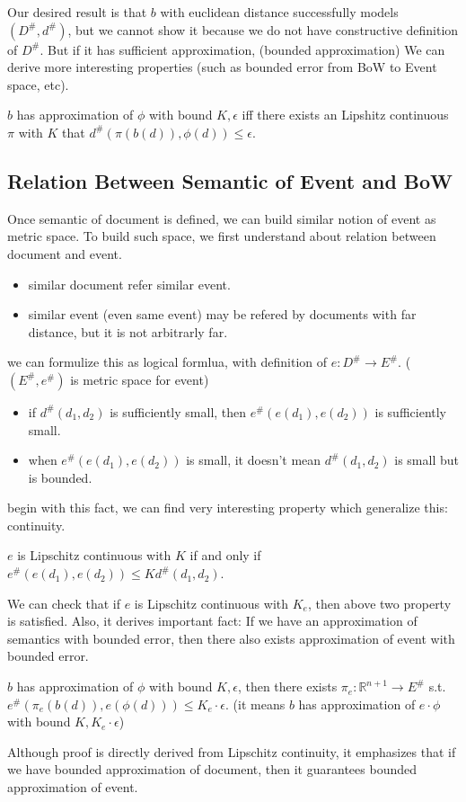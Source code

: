 Our desired result is that $b$ with euclidean distance successfully models $(D^{\#}, d^{\#})$, but we cannot show it because we do not have
constructive definition of $D^{\#}$. But if it has sufficient approximation, (bounded approximation)
We can derive more interesting properties (such as bounded error from BoW to Event space, etc).

\begin{definition}
    $b$ has approximation of $\phi$ with bound $K, \epsilon$ iff there exists an Lipshitz continuous $\pi$ with $K$ that $d^{\#}(\pi(b(d)), \phi(d)) \leq \epsilon$.
\end{definition}

\subsection{Relation Between Semantic of Event and BoW}
Once semantic of document is defined, we can build similar notion of event as metric space. To build such space, we first understand about
relation between document and event.
\begin{itemize}
    \item similar document refer similar event.
    \item similar event (even same event) may be refered by documents with far distance, but it is not arbitrarly far.
\end{itemize}
we can formulize this as logical formlua, with definition of $e: D^{\#} \rightarrow E^{\#}$. ($(E^{\#}, e^{\#})$ is metric space for event)
\begin{itemize}
    \item if $d^{\#}(d_{1}, d_{2})$ is sufficiently small, then $e^{\#}(e(d_{1}), e(d_{2}))$ is sufficiently small.
    \item when $e^{\#}(e(d_{1}), e(d_{2}))$ is small, it doesn't mean $d^{\#}(d_{1}, d_{2})$ is small but is bounded.
\end{itemize}
begin with this fact, we can find very interesting property which generalize this: continuity.
\begin{definition}
    $e$ is Lipschitz continuous with $K$ if and only if\\ $e^{\#}(e(d_{1}), e(d_{2})) \leq K d^{\#}(d_{1}, d_{2})$.
\end{definition}

We can check that if $e$ is Lipschitz continuous with $K_{e}$, then above two property is satisfied. Also, it derives important fact:
If we have an approximation of semantics with bounded error, then there also exists approximation of event with bounded error.
\begin{theorem}
    $b$ has approximation of $\phi$ with bound $K, \epsilon$, then there exists $\pi_{e}: \mathbb{R}^{n+1} \rightarrow E^{\#}$ s.t.
    $e^{\#}(\pi_{e}(b(d)), e(\phi(d))) \leq K_{e} \cdot \epsilon$. (it means $b$ has approximation of $e \cdot \phi$ with bound $K, K_{e} \cdot \epsilon$)
\end{theorem}
Although proof is directly derived from Lipschitz continuity, it emphasizes that if we have bounded approximation of document, then it guarantees
bounded approximation of event.


